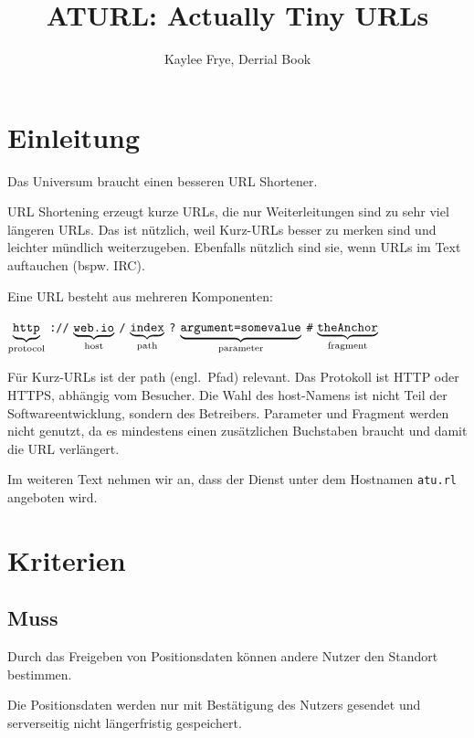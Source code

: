 \documentclass[parskip=full,11pt,twoside]{scrartcl}
\title{ATURL: Actually Tiny URLs}
\author{Kaylee Frye, Derrial Book}
\newcommand\urlpart[2]{$\underbrace{\text{\texttt{#1}}}_{\text{#2}}$}
\begin{document}
\maketitle

\section{Einleitung}

Das Universum braucht einen besseren URL Shortener.

URL Shortening erzeugt kurze URLs,
die nur Weiterleitungen sind zu sehr viel längeren URLs.
Das ist nützlich, weil Kurz-URLs besser zu merken sind
und leichter mündlich weiterzugeben.
Ebenfalls nützlich sind sie,
wenn URLs im Text auftauchen (bspw. IRC).

Eine URL besteht aus mehreren Komponenten:

\begin{center}
\urlpart{http}{protocol}%
\texttt{://}%
\urlpart{web.io}{host}%
\texttt{/}%
\urlpart{index}{path}%
\texttt{?}%
\urlpart{argument=somevalue}{parameter}%
\texttt{\#}%
\urlpart{theAnchor}{fragment}
\end{center}

Für Kurz-URLs ist der path (engl.\ Pfad) relevant.
Das Protokoll ist HTTP oder HTTPS, abhängig vom Besucher.
Die Wahl des host-Namens ist nicht Teil der Softwareentwicklung,
sondern des Betreibers.
Parameter und Fragment werden nicht genutzt,
da es mindestens einen zusätzlichen Buchstaben braucht
und damit die URL verlängert.

Im weiteren Text nehmen wir an,
dass der Dienst unter dem Hostnamen \texttt{atu.rl} angeboten wird.

\pagebreak
\section{Kriterien}

\subsection{Muss}

Durch das Freigeben von Positionsdaten können andere Nutzer den
Standort bestimmen.

Die Positionsdaten werden nur mit Bestätigung
des Nutzers gesendet und serverseitig nicht längerfristig gespeichert.
\end{document}
